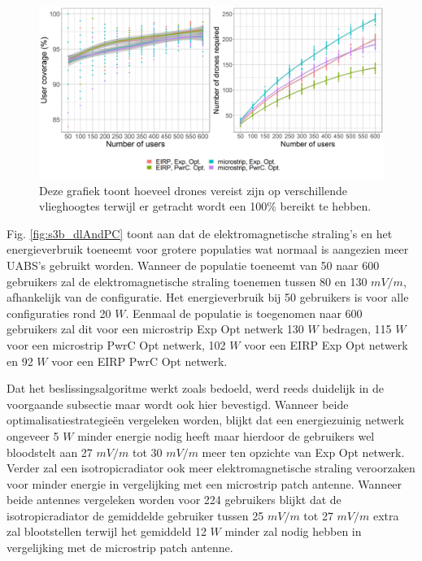 \documentclass[twocolumn]{phdsymp_dutch}
\begin{document}
\begin{figure}[h]
  \includegraphics[width=\linewidth]{../results/s3/uvsnumdronesAndCov.png}
  \caption{Deze grafiek toont hoeveel drones vereist zijn op verschillende vlieghoogtes terwijl er getracht wordt een 100\% bereikt te hebben.}
  \label{fig:s3b_numdronesAndCov}
\end{figure}

Fig. \ref{fig:s3b_dlAndPC} toont aan dat de elektromagnetische straling's en het energieverbruik toeneemt voor grotere populaties wat normaal is aangezien meer \gls{UABS}'s
gebruikt worden. Wanneer de populatie toeneemt van 50 naar 600 gebruikers zal 
de elektromagnetische straling toenemen tussen 80 en 130 $mV/m$, afhankelijk van de configuratie. 
Het energieverbruik bij 50 gebruikers is voor alle configuraties rond 20 $W$.
Eenmaal de populatie is toegenomen naar 600 gebruikers zal dit voor een
microstrip \gls{Exp Opt} netwerk 130 $W$ bedragen, 115 $W$ voor een microstrip \gls{PwrC Opt} netwerk,
102 $W$ voor een \gls{EIRP} \gls{Exp Opt} netwerk en 92 $W$ voor een  \gls{EIRP} \gls{PwrC Opt} netwerk.

Dat het beslissingsalgoritme werkt zoals bedoeld, werd reeds duidelijk in de voorgaande subsectie maar wordt
ook hier bevestigd. Wanneer beide optimalisatiestrategieën vergeleken worden,
blijkt dat een energiezuinig netwerk ongeveer 5 $W$ minder energie nodig heeft maar hierdoor de gebruikers wel 
bloodstelt aan 27 $mV/m$ tot 30 $mV/m$ meer ten opzichte van \gls{Exp Opt} netwerk.
Verder zal een \gls{isotropicradiator} ook meer elektromagnetische straling veroorzaken 
voor minder energie in vergelijking met een microstrip patch antenne.
Wanneer beide antennes vergeleken worden voor 224 gebruikers blijkt 
dat de \gls{isotropicradiator} de gemiddelde gebruiker tussen 
 25 $mV/m$ tot 27 $mV/m$ extra zal blootstellen
 terwijl het gemiddeld 12 $W$ minder zal nodig hebben in vergelijking met de microstrip patch antenne.
\end{document}

